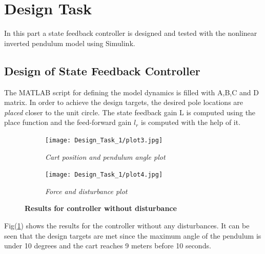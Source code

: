 \documentclass[a4paper,12pt]{article}
\begin{document}
	\section{Design Task}
	In this part a state feedback controller is designed and tested with the nonlinear inverted pendulum model using Simulink.
	\subsection{Design of State Feedback Controller}
	The MATLAB script for defining the model dynamics is filled with A,B,C and D matrix. In order to achieve the design targets, the desired pole locations are \textit{placed} closer to the unit circle. The state feedback gain L is computed using the place function and the feed-forward gain \textit{$l_r$} is computed with the help of it.
	\begin{figure}[H]
	\centering
	\begin{subfigure}[b]{0.75\textwidth}
	    \texttt{[image: Design\_Task\_1/plot3.jpg]}
	    \caption{\textit{Cart position and pendulum angle plot}}
	    \end{subfigure}
	    \vspace{1em}
	    \begin{subfigure}[b]{0.75\textwidth}
	    \texttt{[image: Design\_Task\_1/plot4.jpg]}
	    \caption{\textit{Force and disturbance plot}}
	    \end{subfigure}
	    \caption{\textbf{Results for controller without disturbance}}
	    \label{fig2.1}
	\end{figure}	
	Fig(\ref{fig2.1}) shows the results for the controller without any disturbances. It can be seen that the design targets are met since the maximum angle of the pendulum is under 10 degrees and the cart reaches 9 meters before 10 seconds. \\
\end{document}
